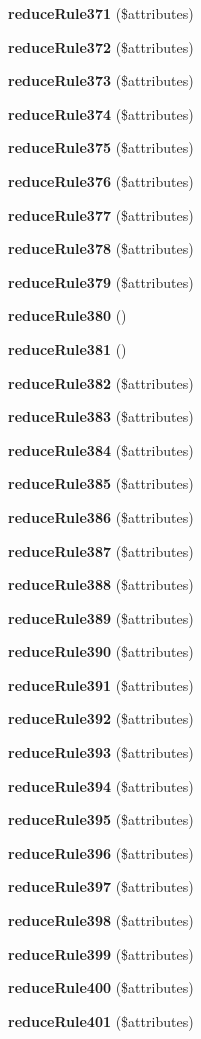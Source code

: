 \begin{DoxyCompactItemize}
\item 
{\bf reduce\+Rule371} (\$attributes)
\item 
{\bf reduce\+Rule372} (\$attributes)
\item 
{\bf reduce\+Rule373} (\$attributes)
\item 
{\bf reduce\+Rule374} (\$attributes)
\item 
{\bf reduce\+Rule375} (\$attributes)
\item 
{\bf reduce\+Rule376} (\$attributes)
\item 
{\bf reduce\+Rule377} (\$attributes)
\item 
{\bf reduce\+Rule378} (\$attributes)
\item 
{\bf reduce\+Rule379} (\$attributes)
\item 
{\bf reduce\+Rule380} ()
\item 
{\bf reduce\+Rule381} ()
\item 
{\bf reduce\+Rule382} (\$attributes)
\item 
{\bf reduce\+Rule383} (\$attributes)
\item 
{\bf reduce\+Rule384} (\$attributes)
\item 
{\bf reduce\+Rule385} (\$attributes)
\item 
{\bf reduce\+Rule386} (\$attributes)
\item 
{\bf reduce\+Rule387} (\$attributes)
\item 
{\bf reduce\+Rule388} (\$attributes)
\item 
{\bf reduce\+Rule389} (\$attributes)
\item 
{\bf reduce\+Rule390} (\$attributes)
\item 
{\bf reduce\+Rule391} (\$attributes)
\item 
{\bf reduce\+Rule392} (\$attributes)
\item 
{\bf reduce\+Rule393} (\$attributes)
\item 
{\bf reduce\+Rule394} (\$attributes)
\item 
{\bf reduce\+Rule395} (\$attributes)
\item 
{\bf reduce\+Rule396} (\$attributes)
\item 
{\bf reduce\+Rule397} (\$attributes)
\item 
{\bf reduce\+Rule398} (\$attributes)
\item 
{\bf reduce\+Rule399} (\$attributes)
\item 
{\bf reduce\+Rule400} (\$attributes)
\item 
{\bf reduce\+Rule401} (\$attributes)
\item 

\end{DoxyCompactItemize}
